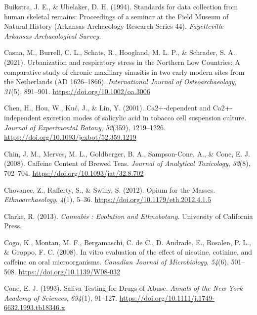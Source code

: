 \documentclass[
]{article}
\newlength{\cslhangindent}
\newenvironment{CSLReferences}[2] %
 {\begin{list}{}{%
  \setlength{\itemindent}{0pt}
  \setlength{\leftmargin}{0pt}
  \setlength{\parsep}{0pt}
  \ifodd #1
   \setlength{\leftmargin}{\cslhangindent}
   \setlength{\itemindent}{-1\cslhangindent}
  \fi
  \setlength{\itemsep}{#2\baselineskip}}}
 {\end{list}}
\begin{document}
\begin{CSLReferences}{1}{0}
Buikstra, J. E., \& Ubelaker, D. H. (1994). Standards for data
collection from human skeletal remains: {Proceedings} of a seminar at
the {Field Museum} of {Natural History} ({Arkansas Archaeology Research
Series} 44). \emph{Fayetteville Arkansas Archaeological Survey}.

Casna, M., Burrell, C. L., Schats, R., Hoogland, M. L. P., \& Schrader,
S. A. (2021). Urbanization and respiratory stress in the {Northern Low
Countries}: {A} comparative study of chronic maxillary sinusitis in two
early modern sites from the {Netherlands} ({AD} 1626--1866).
\emph{International Journal of Osteoarchaeology}, \emph{31}(5),
891--901. \url{https://doi.org/10.1002/oa.3006}

Chen, H., Hou, W., Kuć, J., \& Lin, Y. (2001). Ca2+‐dependent and
{Ca2}+‐independent excretion modes of salicylic acid in tobacco cell
suspension culture. \emph{Journal of Experimental Botany},
\emph{52}(359), 1219--1226.
\url{https://doi.org/10.1093/jexbot/52.359.1219}

Chin, J. M., Merves, M. L., Goldberger, B. A., Sampson-Cone, A., \&
Cone, E. J. (2008). Caffeine {Content} of {Brewed Teas}. \emph{Journal
of Analytical Toxicology}, \emph{32}(8), 702--704.
\url{https://doi.org/10.1093/jat/32.8.702}

Chovanec, Z., Rafferty, S., \& Swiny, S. (2012). Opium for the {Masses}.
\emph{Ethnoarchaeology}, \emph{4}(1), 5--36.
\url{https://doi.org/10.1179/eth.2012.4.1.5}

Clarke, R. (2013). \emph{Cannabis : {Evolution} and {Ethnobotany}}.
{University of California Press}.

Cogo, K., Montan, M. F., Bergamaschi, C. de C., D. Andrade, E., Rosalen,
P. L., \& Groppo, F. C. (2008). In vitro evaluation of the effect of
nicotine, cotinine, and caffeine on oral microorganisms. \emph{Canadian
Journal of Microbiology}, \emph{54}(6), 501--508.
\url{https://doi.org/10.1139/W08-032}

Cone, E. J. (1993). Saliva {Testing} for {Drugs} of {Abuse}.
\emph{Annals of the New York Academy of Sciences}, \emph{694}(1),
91--127. \url{https://doi.org/10.1111/j.1749-6632.1993.tb18346.x}


\end{CSLReferences}
\end{document}
